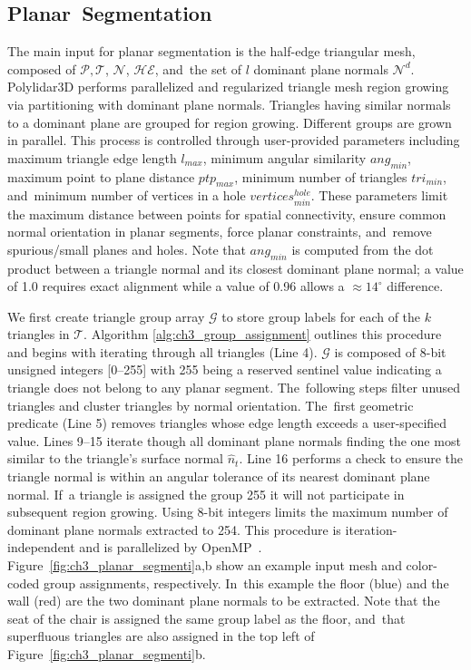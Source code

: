 \subsection{Planar~Segmentation}\label{sec:ch3_methods_polylidar_plane_extraction}

The main input for planar segmentation is the half-edge triangular mesh, composed of $\mathcal{P}, \mathcal{T}$, $\mathcal{N}$, $\mathcal{HE}$, and~the set of $l$ dominant plane normals $\mathcal{N}^d$. Polylidar3D performs parallelized and regularized triangle mesh region growing via partitioning with dominant plane normals. Triangles having similar normals to a dominant plane are grouped for region growing. Different groups are grown in parallel. This process is controlled through user-provided parameters including maximum triangle edge length $l_{max}$, minimum angular similarity $ang_{min}$, maximum point to plane distance $ptp_{max}$, minimum number of triangles $tri_{min}$, and~minimum number of vertices in a hole $vertices^{hole}_{min}$. These parameters limit the maximum distance between points for spatial connectivity, ensure common normal orientation in planar segments, force planar constraints, and~remove spurious/small planes and holes. Note that $ang_{min}$ is computed from the dot product between a triangle normal and its closest dominant plane normal; a value of 1.0 requires exact alignment while a value of 0.96 allows a $\approx 14^\circ$ difference. 


We first create triangle group array $\mathcal{G}$ to store group labels for each of the $k$ triangles in $\mathcal{T}$. Algorithm \ref{alg:ch3_group_assignment} outlines this procedure and begins with iterating through all triangles (Line 4). $\mathcal{G}$ is composed of 8-bit unsigned integers [0--255] with 255 being a reserved sentinel value indicating a triangle does not belong to any planar segment. The~following steps filter unused triangles and cluster triangles by normal orientation. The~first geometric predicate (Line 5) removes triangles whose edge length exceeds a user-specified value.  Lines 9--15 iterate though all dominant plane normals finding the one most similar to the triangle's surface normal $\hat{n}_t$. Line 16 performs a check to ensure the triangle normal is within an angular tolerance of its nearest dominant plane normal. If~a triangle is assigned the group 255 it will not participate in subsequent region growing. Using 8-bit integers limits the maximum number of dominant plane normals extracted to 254. This procedure is iteration-independent and is parallelized by OpenMP~\cite{dagum_openmp_1998}.  Figure~\ref{fig:ch3_planar_segmenti}a,b show an example input mesh and color-coded group assignments, respectively. In~this example the floor (blue) and the wall (red) are the two dominant plane normals to be extracted. Note that the seat of the chair is assigned the same group label as the floor, and~that superfluous triangles are also assigned in the top left of Figure~\ref{fig:ch3_planar_segmenti}b. 

